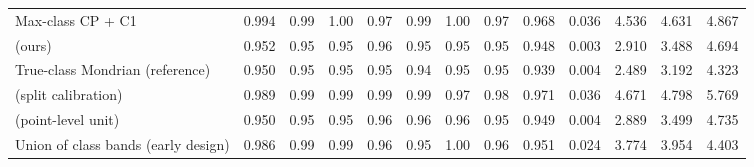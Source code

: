 \begin{table}[!htbp]
{\begin{tabular}{lcccccccccccc}
Max-class CP + C1 & 0.994 & 0.99 & 1.00 & 0.97 & 0.99 & 1.00 & 0.97 & 0.968 & 0.036 & 4.536 & 4.631 & 4.867 \\
\gamut{} (ours) & 0.952 & 0.95 & 0.95 & 0.96 & 0.95 & 0.95 & 0.95 & 0.948 & 0.003 & 2.910 & 3.488 & 4.694 \\
True-class Mondrian (reference) & 0.950 & 0.95 & 0.95 & 0.95 & 0.94 & 0.95 & 0.95 & 0.939 & 0.004 & 2.489 & 3.192 & 4.323 \\
\gamut{} (split calibration) & 0.989 & 0.99 & 0.99 & 0.99 & 0.99 & 0.97 & 0.98 & 0.971 & 0.036 & 4.671 & 4.798 & 5.769 \\
\gamut{} (point-level unit) & 0.950 & 0.95 & 0.95 & 0.96 & 0.96 & 0.96 & 0.95 & 0.949 & 0.004 & 2.889 & 3.499 & 4.735 \\
Union of class bands (early design) & 0.986 & 0.99 & 0.99 & 0.96 & 0.95 & 1.00 & 0.96 & 0.951 & 0.024 & 3.774 & 3.954 & 4.403 \\
\bottomrule
\end{tabular}}
\end{table}
\FloatBarrier

